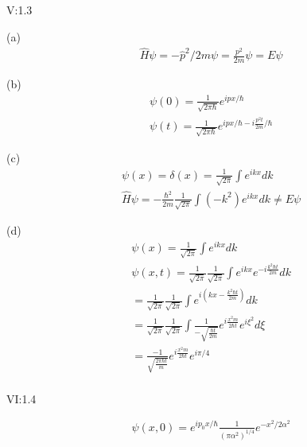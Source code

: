 \documentclass{article}
\begin{document}
  V:1.3

  (a)\begin{align*}
  &\hat H\psi=-\hat p^2/2m\psi=\frac{p^2}{2m}\psi=E\psi
  \end{align*}

  (b)\begin{align*}
    &\psi(0)=\frac1{\sqrt{2\pi\hbar}}e^{ipx/\hbar}\\
    & \psi(t)=\frac1{\sqrt{2\pi\hbar}}e^{ipx/\hbar-i\frac{p^2t}{2m}/\hbar}
  \end{align*}

  (c)\begin{align*}
    &\psi(x)= \delta (x)=\frac1{\sqrt{2\pi}}\int e^{ikx}dk\\
    & \hat H \psi=-\frac{\hbar^2}{2m}\frac1{\sqrt{2\pi}}\int (-k^2)e^{ikx}dk\ne E \psi
  \end{align*}

  (d)\begin{align*}
    &\psi(x)=\frac1{\sqrt{2\pi}}\int e^{ikx}dk\\
    &\psi(x,t) =\frac1{\sqrt{2\pi}}\frac1{\sqrt{2\pi}}\int e^{ikx}e^{-i\frac{ k^2\hbar t}{2 m}}dk \\
    & =\frac1{\sqrt{2\pi}}\frac1{\sqrt{2\pi}}\int e^{i(kx-\frac{k^2\hbar t}{2m})}dk \\
    &=\frac1{\sqrt{2\pi}}\frac1{\sqrt{2\pi}}\int \frac{1}{-\sqrt{\frac{\hbar t}{2m}}}e^{i\frac{x^2m}{2\hbar t}}e^{i\xi^2}d\xi \\
    &=\frac{-1}{\sqrt{\frac{2\pi\hbar t}{m}}}e^{i\frac{x^2 m}{2\hbar t}}e^{i\pi/4}  \\
  \end{align*}

  VI:1.4 

\begin{align*}
    &\psi(x,0)=e^{ip_0x/\hbar}\frac1{(\pi\alpha^2)^{1/4}}e^{-x^2/2\alpha^2}
\end{align*}
\end{document}
